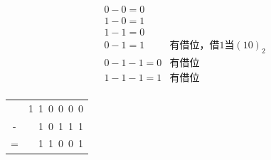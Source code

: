 \begin{frame}
  \begin{free}[减法法则]{}
    \[
      \begin{array}{rl}
        0-0=0&\\
        1-0=1&\\
        1-1=0&\\
        0-1=1&\mbox{有借位，借1当$(10)_2$}\\
        0-1-1=0&\mbox{有借位}\\
        1-1-1=1&\mbox{有借位}\\
      \end{array}
    \]
  \end{free}

  \begin{exam}{}
    \begin{table}
      \centering
      \begin{tabular}{cD{.}{.}{3}}
          &1~1~0~0~0~0\\
        -&1~0~1~1~1\\
        \hline
        =&1~1~0~0~1
      \end{tabular}
    \end{table}
  \end{exam}
\end{frame}

